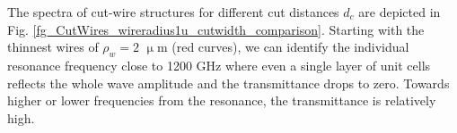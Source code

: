 The spectra of cut-wire structures for different cut distances $d_c$ are depicted in Fig. \ref{fg_CutWires_wireradius1u_cutwidth_comparison}. Starting with the thinnest wires of $\rho_w = 2$ $\upmu$m (red curves), we can identify the individual resonance frequency close to  1200 GHz where even a single layer of unit cells reflects the whole wave amplitude and the transmittance drops to zero. Towards higher or lower frequencies from the resonance, the transmittance is relatively high.


